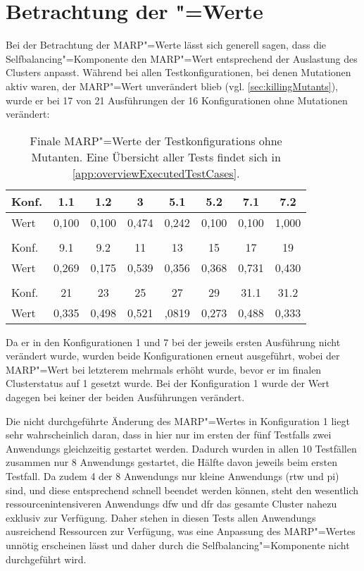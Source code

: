 \section{Betrachtung der "=Werte}
\label{sec:marpValueResults}

Bei der Betrachtung der \gls{MARP}"=Werte lässt sich generell sagen, dass die Selfbalancing"=Komponente den \gls{MARP}"=Wert entsprechend der Auslastung des Clusters anpasst.
Während bei allen Testkonfigurationen, bei denen Mutationen aktiv waren, der \gls{MARP}"=Wert unverändert blieb (vgl. \cref{sec:killingMutants}), wurde er bei 17 von 21 Ausführungen der 16 Konfigurationen ohne Mutationen verändert:

\begin{table}[h]
    \begin{tabular}{l|c|c|c|c|c|c|c}
    	Konf. &  1.1  &  1.2  &   3   &  5.1  &  5.2  &  7.1  &  7.2  \\ \hline
    	Wert  & 0,100 & 0,100 & 0,474 & 0,242 & 0,100 & 0,100 & 1,000 \\
    	\multicolumn{8}{c}{} \\
    	Konf. &  9.1  &  9.2  &  11   &  13   &  15   &  17   &  19   \\ \hline
    	Wert  & 0,269 & 0,175 & 0,539 & 0,356 & 0,368 & 0,731 & 0,430 \\
    	\multicolumn{8}{c}{} \\
    	Konf. &  21   &  23   &  25   &  27   &  29   & 31.1  & 31.2  \\ \hline
    	Wert  & 0,335 & 0,498 & 0,521 & ,0819 & 0,273 & 0,488 & 0,333
    \end{tabular}
    \caption[Finale \acrshort{MARP}"=Werte der \glspl{Testkonfiguration} ohne Mutanten.]
    {Finale \acrshort{MARP}"=Werte der \glspl{Testkonfiguration} ohne Mutanten.
    Eine Übersicht aller Tests findet sich in \cref{app:overviewExecutedTestCases}.}
    \label{tab:finalMarpValues}
\end{table}

Da er in den Konfigurationen 1 und 7 bei der jeweils ersten Ausführung nicht verändert wurde, wurden beide Konfigurationen erneut ausgeführt, wobei der \gls{MARP}"=Wert bei letzterem mehrmals erhöht wurde, bevor er im finalen Clusterstatus auf 1 gesetzt wurde.
Bei der Konfiguration 1 wurde der Wert dagegen bei keiner der beiden Ausführungen verändert.

Die nicht durchgeführte Änderung des \gls{MARP}"=Wertes in Konfiguration 1 liegt sehr wahrscheinlich daran, dass in hier nur im ersten der fünf \glspl{Testfall} zwei \glspl{Anwendung} gleichzeitig gestartet werden.
Dadurch wurden in allen 10 Testfällen zusammen nur 8 \glspl{Anwendung} gestartet, die Hälfte davon jeweils beim ersten Testfall.
Da zudem 4 der 8 \glspl{Anwendung} nur kleine \glspl{Anwendung} (\acrlong{rtw} und \acrlong{pi}) sind, und diese entsprechend schnell beendet werden können, steht den wesentlich ressourcenintensiveren \glspl{Anwendung} \acrlong{dfw} und \acrlong{dfr} das gesamte Cluster nahezu exklusiv zur Verfügung.
Daher stehen in diesen \glspl{Test} allen \glspl{Anwendung} ausreichend Ressourcen zur Verfügung, was eine Anpassung des \gls{MARP}"=Wertes unnötig erscheinen lässt und daher durch die Selfbalancing"=Komponente nicht durchgeführt wird.

